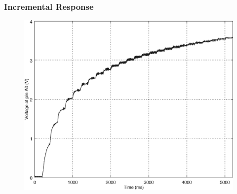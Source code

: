 \subsubsection{Incremental Response}
\label{sub:IncrementalResponse}

\begin{figure}[h]
    \centering
    \includegraphics[width=.85\textwidth]{img/incstep_response}
    \caption{}
    \label{fig:incstep_response}
\end{figure}

